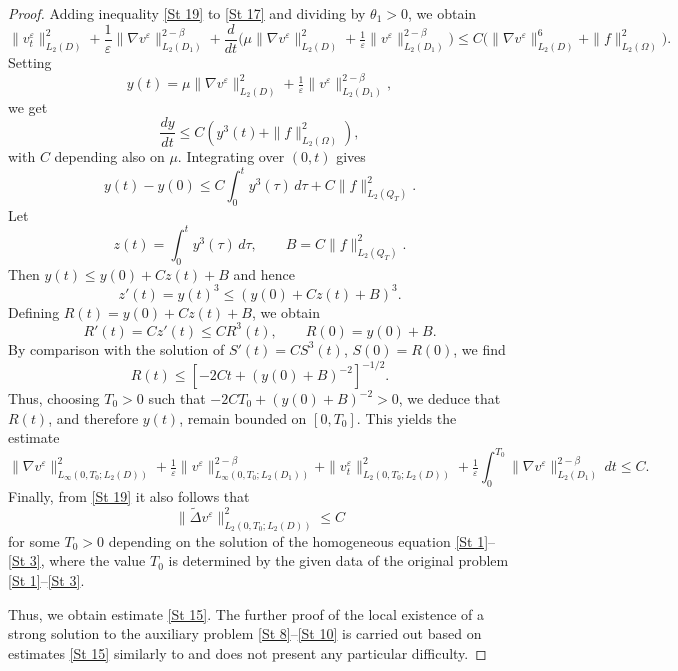\documentclass[10pt,a4paper]{amsart}
\begin{document}
\begin{proof}
Adding inequality \eqref{St 19} to \eqref{St 17} and dividing by $\theta_1>0$, we obtain  
\[
\| v^{\varepsilon}_{t} \|^{2}_{L_2(D)} + \frac{1}{\varepsilon} \|\nabla v^{\varepsilon}\|^{2-\beta}_{L_2(D_1)} + \frac{d}{dt}\Big( {\mu}\|\nabla v^{\varepsilon} \|^{2}_{L_2(D)} + \tfrac{1}{\varepsilon}\|v^{\varepsilon}\|^{2-\beta}_{L_2 (D_1)}\Big) 
\leq C\big( \|\nabla v^{\varepsilon}\|^{6}_{L_2 (D)} + \|f\|^{2}_{L_2 (\Omega)}\big).
\]
Setting  
\[
y(t)= {\mu}\|\nabla v^{\varepsilon} \|^{2}_{L_2(D)} + \tfrac{1}{\varepsilon}\|v^{\varepsilon}\|^{2-\beta}_{L_2 (D_1)},
\]
we get
\[
\frac{dy}{dt}\leq C \left(y^3(t)+\|f\|^{2}_{L_2 (\Omega)} \right),
\]
{with $C$ depending also on $\mu$.}
Integrating over $(0,t)$ gives  
\[
y(t)-y(0)\leq C\int_0^t y^3(\tau)\,d\tau + C\|f\|^{2}_{L_2 (Q_T)}.
\]
Let  
\[
z(t)=\int_0^t y^3(\tau)\,d\tau, \qquad B=C\|f\|^{2}_{L_2(Q_T)}.
\]
Then $y(t)\le y(0)+Cz(t)+B$ and hence  
\[
z'(t)=y(t)^3 \le (y(0)+Cz(t)+B)^3.
\]
Defining $R(t)=y(0)+Cz(t)+B$, we obtain
\[
R'(t)=Cz'(t)\le C R^3(t), \qquad R(0)=y(0)+B.
\]
By comparison with the solution of $S'(t)=C S^3(t)$, $S(0)=R(0)$, we find
\[
R(t)\le \left[-2Ct+(y(0)+B)^{-2}\right]^{-1/2}.
\]
Thus, choosing $T_0>0$ such that $-2CT_0+(y(0)+B)^{-2}>0$, we deduce that $R(t)$, and therefore $y(t)$, remain bounded on $[0,T_0]$. This yields the estimate
\begin{equation} \label{St 20}
	\|\nabla v^{\varepsilon} \|^2_{L_\infty(0,T_0;L_2(D))} + \tfrac{1}{\varepsilon} \| v^{\varepsilon} \|^{2-\beta}_{L_\infty(0,T_0;L_2(D_1))} + \| v^{\varepsilon}_{t} \|^2_{L_2(0, T_0; L_2(D))} + \tfrac{1}{\varepsilon} \int_0^{T_0} \|\nabla v^{\varepsilon} \|^{2-\beta}_{L_2(D_1)}\,dt \leq C.
\end{equation}
Finally, from \eqref{St 19} it also follows that
\begin{equation} \label{St 21}
	\|\tilde{\Delta} v^{\varepsilon} \|^2_{L_2(0,T_0;L_2(D))} \leq C
\end{equation}
for some $T_0>0$
depending on the solution of the homogeneous equation \eqref{St 1}--\eqref{St 3}, where the value \( T_0 \) is determined by the given data of the original problem \eqref{St 1}--\eqref{St 3}. 

Thus, we obtain estimate \eqref{St 15}. The  further proof of the local existence of a strong solution to the auxiliary problem \eqref{St 8}--\eqref{St 10} %
is carried out based on estimates  \eqref{St 15} similarly to \cite[{section~III.3}]{antontsev1989boundary} and does not present any particular difficulty.
\medskip


\end{proof}
\end{document}
